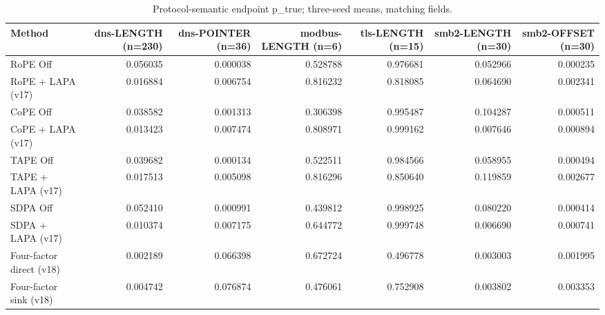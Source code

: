 \begin{table}[t]
\centering
\scriptsize
\caption{Protocol-semantic endpoint p\_true; three-seed means, matching fields.}
\begin{tabular}{lrrrrrr}
\toprule
Method & dns-LENGTH (n=230) & dns-POINTER (n=36) & modbus-LENGTH (n=6) & tls-LENGTH (n=15) & smb2-LENGTH (n=30) & smb2-OFFSET (n=30) \\
\midrule
RoPE Off & 0.056035 & 0.000038 & 0.528788 & 0.976681 & 0.052966 & 0.000235 \\
RoPE + LAPA (v17) & 0.016884 & 0.006754 & 0.816232 & 0.818085 & 0.064690 & 0.002341 \\
CoPE Off & 0.038582 & 0.001313 & 0.306398 & 0.995487 & 0.104287 & 0.000511 \\
CoPE + LAPA (v17) & 0.013423 & 0.007474 & 0.808971 & 0.999162 & 0.007646 & 0.000894 \\
TAPE Off & 0.039682 & 0.000134 & 0.522511 & 0.984566 & 0.058955 & 0.000494 \\
TAPE + LAPA (v17) & 0.017513 & 0.005098 & 0.816296 & 0.850640 & 0.119859 & 0.002677 \\
SDPA Off & 0.052410 & 0.000991 & 0.439812 & 0.998925 & 0.080220 & 0.000414 \\
SDPA + LAPA (v17) & 0.010374 & 0.007175 & 0.644772 & 0.999748 & 0.006690 & 0.000741 \\
Four-factor direct (v18) & 0.002189 & 0.066398 & 0.672724 & 0.496778 & 0.003003 & 0.001995 \\
Four-factor sink (v18) & 0.004742 & 0.076874 & 0.476061 & 0.752908 & 0.003802 & 0.003353 \\
\bottomrule
\end{tabular}
\end{table}
